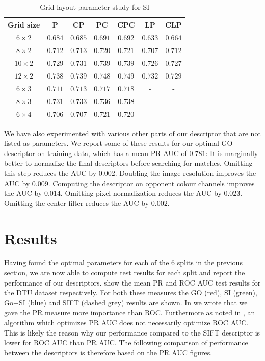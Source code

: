 \documentclass[thesis.tex]{subfiles}
\begin{document}
%
\begin{table}[tb]
\centering
\begin{tabular}{ c c c c c c c }
\toprule
Grid size & P & CP & PC & CPC & LP & CLP \\ \midrule
$6 \times 2$ & $0.684$ & $0.685$ & $0.691$ & $0.692$ & $0.633$ & $0.664$ \\ 
$8 \times 2$ & $0.712$ & $0.713$ & $0.720$ & $0.721$ & $0.707$ & $0.712$ \\ 
$10 \times 2$ & $0.729$ & $0.731$ & $0.739$ & $0.739$ & $0.726$ & $0.727$ \\ 
$12 \times 2$ & $0.738$ & $0.739$ & $0.748$ & $\mathbf{0.749}$ & $0.732$ & $0.729$ \\ 
$6 \times 3$ & $0.711$ & $0.713$ & $0.717$ & $0.718$ & - & - \\ 
$8 \times 3$ & $0.731$ & $0.733$ & $0.736$ & $0.738$ & - & - \\ 
$6 \times 4$ & $0.706$ & $0.707$ & $0.721$ & $0.720$ & - & - \\
\bottomrule
\end{tabular}
\caption{Grid layout parameter study for SI}
\label{tbl:dtuLayoutParametersSi}
\end{table}
%
We have also experimented with various other parts of our descriptor that are not listed as parameters. We report some of these results for our optimal GO descriptor on training data, which has a mean PR AUC of $0.781$: It is marginally better to normalize the final descriptors before searching for matches. Omitting this step reduces the AUC by $0.002$. Doubling the image resolution improves the AUC by $0.009$. Computing the descriptor on opponent colour channels improves the AUC by $0.014$. Omitting pixel normalization reduces the AUC by $0.023$. Omitting the center filter reduces the AUC by $0.002$.
%
\section{Results}
%
Having found the optimal parameters for each of the 6 splits in the previous section, we are now able to compute test results for each split and report the performance of our descriptors.  show the mean PR and ROC AUC test results for the DTU dataset respectively. For both these measures the GO (red), SI (green), Go+SI (blue) and SIFT (dashed grey) results are shown. In  we wrote that we gave the PR measure more importance than ROC. Furthermore as noted in , an algorithm which optimizes PR AUC does not necessarily optimize ROC AUC. This is likely the reason why our performance compared to the SIFT descriptor is lower for ROC AUC than PR AUC. The following comparison of performance between the descriptors is therefore based on the PR AUC figures.
\end{document}
